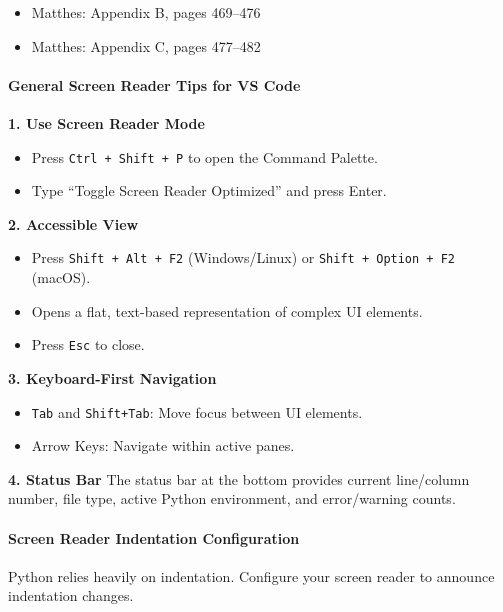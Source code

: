 \documentclass[
  justified,
  openright,
]{tufte-book}
\let\subsection\paragraph
\let\paragraph\paragraph
\let\subsection\paragraph
\let\paragraph\paragraph
\providecommand{\tightlist}{%
  \setlength{\itemsep}{0pt}\setlength{\parskip}{0pt}}
\begin{document}
\begin{itemize}
\tightlist
\item
  Matthes: Appendix B, pages 469--476
\item
  Matthes: Appendix C, pages 477--482
\end{itemize}

\subsection{General Screen Reader Tips for VS
Code}\label{general-screen-reader-tips-for-vs-code}

\textbf{1. Use Screen Reader Mode}

\begin{itemize}
\tightlist
\item
  Press \texttt{Ctrl\ +\ Shift\ +\ P} to open the Command Palette.
\item
  Type ``Toggle Screen Reader Optimized'' and press Enter.
\end{itemize}

\textbf{2. Accessible View}

\begin{itemize}
\tightlist
\item
  Press \texttt{Shift\ +\ Alt\ +\ F2} (Windows/Linux) or
  \texttt{Shift\ +\ Option\ +\ F2} (macOS).
\item
  Opens a flat, text-based representation of complex UI elements.
\item
  Press \texttt{Esc} to close.
\end{itemize}

\textbf{3. Keyboard-First Navigation}

\begin{itemize}
\tightlist
\item
  \texttt{Tab} and \texttt{Shift+Tab}: Move focus between UI elements.
\item
  Arrow Keys: Navigate within active panes.
\end{itemize}

\textbf{4. Status Bar} The status bar at the bottom provides current
line/column number, file type, active Python environment, and
error/warning counts.

\subsection{Screen Reader Indentation
Configuration}\label{screen-reader-indentation-configuration}

Python relies heavily on indentation. Configure your screen reader to
announce indentation changes.
\end{document}
